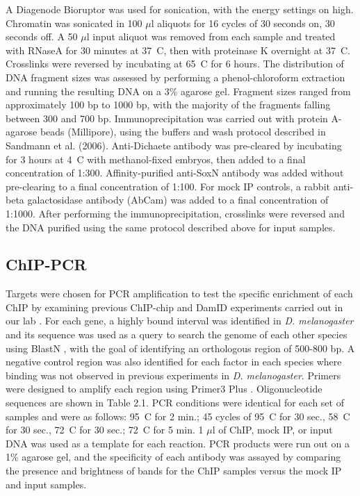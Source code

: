 A Diagenode Bioruptor was used for sonication, with the energy settings on high. Chromatin was sonicated in 100 \(\mu\)l aliquots for 16 cycles of 30 seconds on, 30 seconds off. A 50 \(\mu\)l input aliquot was removed from each sample and treated with RNaseA for 30 minutes at 37\degree~C, then with proteinase K overnight at 37\degree~C. Crosslinks were reversed by incubating at 65\degree~C for 6 hours. The distribution of DNA fragment sizes was assessed by performing a phenol-chloroform extraction and running the resulting DNA on a 3\% agarose gel. Fragment sizes ranged from approximately 100 bp to 1000 bp, with the majority of the fragments falling between 300 and 700 bp. Immunoprecipitation was carried out with protein A-agarose beads (Millipore), using the buffers and wash protocol described in Sandmann et al. (2006). Anti-Dichaete antibody was pre-cleared by incubating for 3 hours at 4\degree~C with methanol-fixed embryos, then added to a final concentration of 1:300. Affinity-purified anti-SoxN antibody was added without pre-clearing to a final concentration of 1:100. For mock IP controls, a rabbit anti-beta galactosidase antibody (AbCam) was added to a final concentration of 1:1000. After performing the immunoprecipitation, crosslinks were reversed and the DNA purified using the same protocol described above for input samples.

\subsection{ChIP-PCR}
Targets were chosen for PCR amplification to test the specific enrichment of each ChIP by examining previous ChIP-chip and DamID experiments carried out in our lab \citep{aleksic_role_2013,ferrero_soxneuro_2014}. For each gene, a highly bound interval was identified in \emph{D. melanogaster} and its sequence was used as a query to search the genome of each other species using BlastN \citep{altschul_basic_1990}, with the goal of identifying an orthologous region of 500-800 bp. A negative control region was also identified for each factor in each species where binding was not observed in previous experiments in \emph{D. melanogaster}. Primers were designed to amplify each region using Primer3 Plus \citep{untergasser_primer3plus_2007}. Oligonucleotide sequences are shown in Table 2.1. PCR conditions were identical for each set of samples and were as follows: 95\degree~C for 2 min.; 45 cycles of 95\degree~C for 30 sec., 58\degree~C for 30 sec., 72\degree~C for 30 sec.; 72\degree~C for 5 min. 1 \(\mu\)l of ChIP, mock IP, or input DNA was used as a template for each reaction. PCR products were run out on a 1\% agarose gel, and the specificity of each antibody was assayed by comparing the presence and brightness of bands for the ChIP samples versus the mock IP and input samples.

